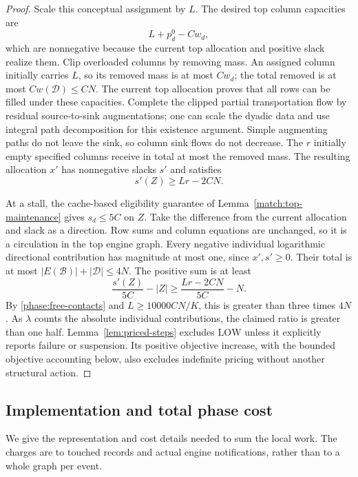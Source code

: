 \begin{proof}
Scale this conceptual assignment by \(L\).
The desired top column capacities are
\[
                         L+p_d^0-Cw_d ,
\]
which are nonnegative because the current top allocation and
positive slack realize them.  Clip overloaded columns by
removing mass.  An assigned column initially carries \(L\),
so its removed mass is at most \(Cw_d\); the total removed is
at most \(Cw(\mathcal D)\le CN\).
The current top allocation proves that all rows can be filled
under these capacities.  Complete the clipped partial
transportation flow by residual source-to-sink augmentations;
one can scale the dyadic data and use integral path
decomposition for this existence argument.  Simple augmenting
paths do not leave the sink, so column sink flows do not
decrease.  The \(r\) initially empty specified columns receive
in total at most the removed mass.
The resulting allocation \(x'\) has nonnegative slacks \(s'\)
and satisfies
\begin{equation}
\label{phase:alternative-slack}
                           s'(Z)\ge Lr-2CN .
\end{equation}

At a stall, the cache-based eligibility guarantee of
Lemma~\ref{match:top-maintenance} gives \(s_d\le5C\) on \(Z\).
Take the difference from the current allocation and slack as
a direction.  Row sums and column equations are unchanged,
so it is a circulation in the top engine graph.
Every negative individual logarithmic directional contribution
has magnitude at most one, since \(x',s'\ge0\).
Their total is at most
\(|E(\mathcal B)|+|\mathcal D|\le4N\).
The positive sum is at least
\[
 \frac{s'(Z)}{5C}-|Z|
 \ge \frac{Lr-2CN}{5C}-N .
 \]
By \eqref{phase:free-contacts} and
\(L\ge10000CN/K\), this is greater than three times \(4N\).
As \(\lambda\) counts the absolute individual contributions,
the claimed ratio is greater than one half.
Lemma~\ref{lem:priced-steps} excludes \(\mathrm{LOW}\) unless
it explicitly reports failure or suspension.  Its positive
objective increase, with the bounded objective accounting
below, also excludes indefinite pricing without another
structural action.
\end{proof}

\subsection{Implementation and total phase cost}
\label{phase:implementation}

We give the representation and cost details needed to sum the
local work.  The charges are to touched records and actual
engine notifications, rather than to a whole graph per event.

